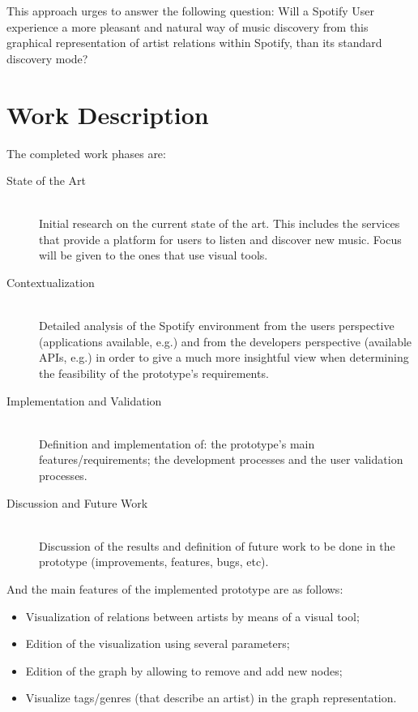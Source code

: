 \documentclass[twocolumn]{article}
\begin{document}
  This approach urges to answer the following question: Will a Spotify User experience a more pleasant and natural way of music discovery from this graphical representation of artist relations within Spotify, than its standard discovery mode?

\section{Work Description}
\label{sec:work}
  
  The completed work phases are:

  \begin{description}
    \item[State of the Art] \hfill \\
      Initial research on the current state of the art. 
      This includes the services that provide a platform for users to listen and discover new music. 
      Focus will be given to the ones that use visual tools.
    \item[Contextualization] \hfill \\
      Detailed analysis of the Spotify environment from the users perspective (applications available, e.g.) and from the developers perspective (available APIs, e.g.) in order to give a much more insightful view when determining the feasibility of the prototype's requirements.
    \item[Implementation and Validation] \hfill \\
      Definition and implementation of: the prototype's main features/requirements; the development processes and the user validation processes.
    \item[Discussion and Future Work] \hfill \\
      Discussion of the results and definition of future work to be done in the prototype (improvements, features, bugs, etc).
  \end{description}

  And the main features of the implemented prototype are as follows:

  \begin{itemize}
    \item Visualization of relations between artists by means of a visual tool;
    \item Edition of the visualization using several parameters;
    \item Edition of the graph by allowing to remove and add new nodes;
    \item Visualize tags/genres (that describe an artist) in the graph representation.
  \end{itemize}
\end{document}
